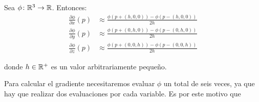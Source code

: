 \begin{proposicion}
    Sea $\phi\colon \mathbb{R}^3\to\mathbb{R}$. Entonces:
    \begin{align*}
        \frac{\partial\phi}{\partial x}(p) &\approx \frac{\phi(p+(h,0,0)) - \phi(p-(h,0,0))}{2h}\\[10pt]
        \frac{\partial\phi}{\partial y}(p) &\approx \frac{\phi(p+(0,h,0)) - \phi(p-(0,h,0))}{2h}\\[10pt]
        \frac{\partial\phi}{\partial z}(p) &\approx \frac{\phi(p+(0,0,h)) - \phi(p-(0,0,h))}{2h}
    \end{align*}
    
    donde $h\in\mathbb{R}^+$ es un valor arbitrariamente pequeño. 
\end{proposicion}

Para calcular el gradiente necesitaremos evaluar $\phi$ un total de seis veces, ya que hay que realizar dos evaluaciones por cada variable. Es por este motivo que 
